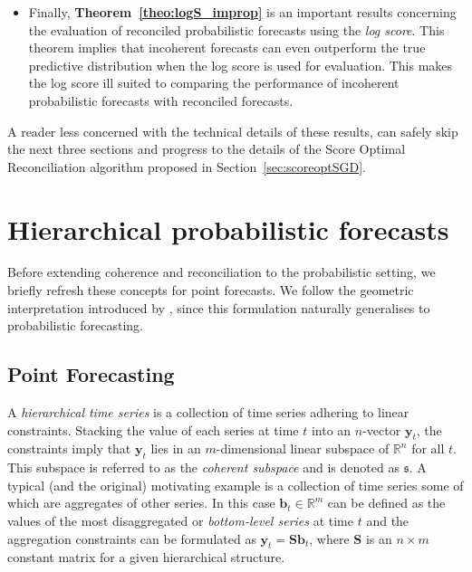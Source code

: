 \documentclass[a4paper,12pt]{article}
\theoremstyle{definition}
\begin{document}
{\begin{itemize}
	\item Finally, \textbf{Theorem~\ref{theo:logS_improp}} is an important results concerning the evaluation of reconciled probabilistic forecasts using the \textit{log score}. This theorem implies that incoherent forecasts can even outperform the true predictive distribution when the log score is used for evaluation. This makes the log score ill suited to comparing the performance of incoherent probabilistic forecasts with reconciled forecasts.
\end{itemize}

A reader less concerned with the technical details of these results, can safely skip the next three sections and progress to the details of the Score Optimal Reconciliation algorithm proposed in Section~\ref{sec:scoreoptSGD}.
}




\section{Hierarchical probabilistic forecasts}\label{sec:ProbForecasts}

Before extending coherence and reconciliation to the probabilistic setting, we briefly refresh these concepts for point forecasts. We follow the geometric interpretation introduced by \cite{PanEtAl2020_Geometry}, since this formulation naturally generalises to probabilistic forecasting.

\subsection{Point Forecasting}\label{sec:PointForecasts}

A \emph{hierarchical time series} is a collection of time series adhering to linear constraints. Stacking the value of each series at time $t$ into an $n$-vector $\bm{y}_t$, the constraints imply that $\bm{y}_t$ lies in an $m$-dimensional linear subspace of $\mathbb{R}^n$ for all $t$. This subspace is referred to as the \emph{coherent subspace} and is denoted as $\mathfrak{s}$. A typical (and the original) motivating example is a collection of time series some of which are aggregates of other series. In this case $\bm{b}_t \in \mathbb{R}^m$ can be defined as the values of the most disaggregated or \emph{bottom-level series} at time $t$ and the aggregation constraints can be formulated as $\bm{y}_t = \bm{S}\bm{b}_t$, where $\bm{S}$ is an $n \times m$ constant matrix for a given hierarchical structure.
\end{document}
